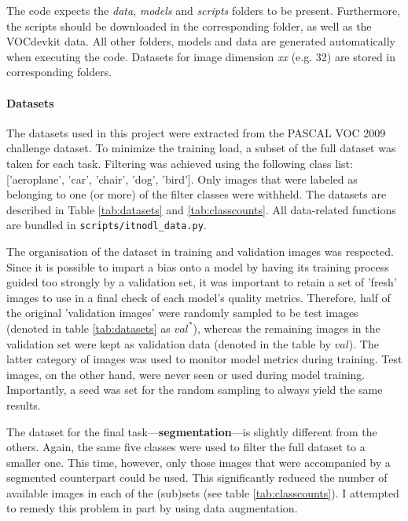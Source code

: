 The code expects the \textit{data}, \textit{models} and \textit{scripts} folders to be present. Furthermore, the scripts should be downloaded in the corresponding folder, as well as the VOCdevkit data. All other folders, models and data are generated automatically when executing the code. Datasets for image dimension \textit{xx} (e.g. 32) are stored in corresponding folders.

\paragraph{Datasets} The datasets used in this project were extracted from the PASCAL VOC 2009 challenge dataset. To minimize the training load, a subset of the full dataset was taken for each task. Filtering was achieved using the following class list: ['aeroplane', 'car', 'chair', 'dog', 'bird']. Only images that were labeled as belonging to one (or more) of the filter classes were withheld. The datasets are described in Table \ref{tab:datasets} and \ref{tab:classcounts}. All data-related functions are bundled in \texttt{scripts/itnodl\_data.py}.


The organisation of the dataset in training and validation images was respected. Since it is possible to impart a bias onto a model by having its training process guided too strongly by a validation set, it was important to retain a set of 'fresh' images to use in a final check of each model's quality metrics. Therefore, half of the original 'validation images' were randomly sampled to be test images (denoted in table \ref{tab:datasets} as $val^\ast$), whereas the remaining images in the validation set were kept as validation data (denoted in the table by $val$). The latter category of images was used to monitor model metrics during training. Test images, on the other hand, were never seen or used during model training. Importantly, a seed was set for the random sampling to always yield the same results.
 
The dataset for the final task---\textbf{segmentation}---is slightly different from the others. Again, the same five classes were used to filter the full dataset to a smaller one. This time, however, only those images that were accompanied by a segmented counterpart could be used. This significantly reduced the number of available images in each of the (sub)sets (see table \ref{tab:classcounts}). I attempted to remedy this problem in part by using data augmentation.


